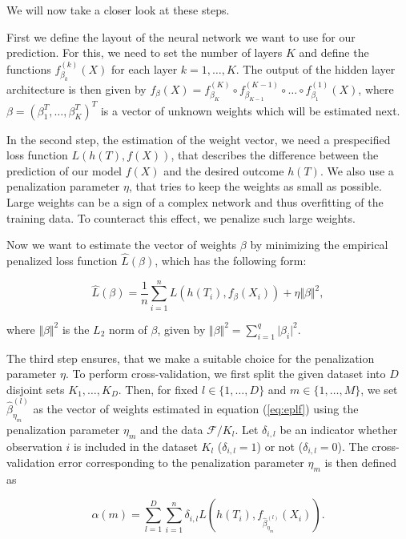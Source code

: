 \documentclass[12pt, a4paper]{article}
\theoremstyle{definition}
\theoremstyle{plain}
\numberwithin{equation}{section}
\numberwithin{figure}{section}
\numberwithin{table}{section}
\begin{document}
	We will now take a closer look at these steps.

	First we define the layout of the neural network we want to use for our prediction.
	For this, we need to set the number of layers $K$ and define the functions $f_{\beta_k}^{(k)}(X)$ for each layer $k = 1, \dots, K$.
	The output of the hidden layer architecture is then given by $f_{\beta}(X) = f_{\beta_K}^{(K)} \circ f_{\beta_{K-1}}^{(K-1)} \circ \dots \circ f_{\beta_1}^{(1)}(X)$, where $\beta = (\beta_1^T, \dots, \beta_K^T)^T$ is a vector of unknown weights which will be estimated next.
	
	In the second step, the estimation of the weight vector, we need a prespecified loss function $L(h(T), f(X))$, that describes the difference between the prediction of our model $f(X)$ and the desired outcome $h(T)$.
	We also use a penalization parameter $\eta$, that tries to keep the weights as small as possible.
	Large weights can be a sign of a complex network and thus overfitting of the training data.
	To counteract this effect, we penalize such large weights.
	
	
	Now we want to estimate the vector of weights $\beta$ by minimizing the empirical penalized loss function $\hat{L}(\beta)$, which has the following form:
	
	\begin{equation}\label{eq:eplf}
	\hat{L}(\beta) = \frac{1}{n} \sum_{i=1}^n L( h(T_i), f_{\beta}(X_i)) + \eta \Vert \beta \Vert ^2,
	\end{equation}
	
	where $\Vert \beta \Vert ^2$ is the $L_2$ norm of $\beta$, given by $\Vert \beta \Vert ^2 = \sum_{i=1}^q \vert \beta _i \vert ^2.$
	
	The third step ensures, that we make a suitable choice for the penalization parameter $\eta$.
	To perform cross-validation, we first split the given dataset into $D$ disjoint sets $K_1,\dots, K_D$.
	Then, for fixed $l \in \{1,\dots,D\}$ and $m \in \{1,\dots,M\}$, we set $\hat{\beta}_{\eta_{m}}^{(l)}$ as the vector of weights estimated in equation (\ref{eq:eplf}) using the penalization parameter $\eta_m$ and the data $\mathcal{F} / K_l$.
	Let $\delta_{i,l}$ be an indicator whether observation $i$ is included in the dataset $K_l$ ($\delta_{i,l} = 1$) or not ($\delta_{i,l}=0$).
	The cross-validation error corresponding to the penalization parameter $\eta_m$ is then defined as
	
	\begin{equation*}
	 \alpha(m) = \sum_{l=1}^D \sum_{i=1}^n \delta_{i,l} L(h(T_i), f_{\hat{\beta}_{\eta_m}^{(l)}}(X_i)).
 	\end{equation*}
 	
\end{document}
